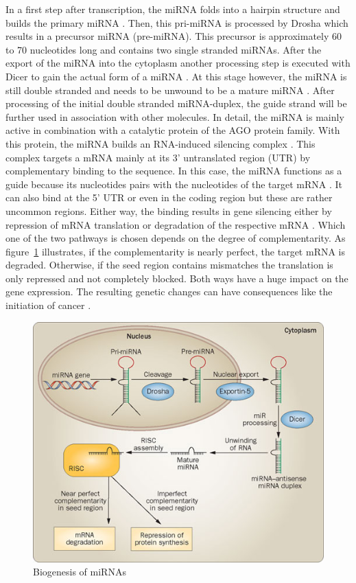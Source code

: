 \documentclass[11pt, a4paper, oneside]{book}
\begin{document}
In a first step after transcription, the miRNA folds into a hairpin structure and builds the primary miRNA \cite{Lee}. Then, this pri-miRNA is processed by Drosha which results in a precursor miRNA (pre-miRNA). This precursor is approximately 60 to 70 nucleotides long and contains two single stranded miRNAs. After the export of the miRNA into the cytoplasm another processing step is executed with Dicer to gain the actual form of a miRNA \cite{Lee}. At this stage however, the miRNA is still double stranded and needs to be unwound to be a mature miRNA \cite{Macfarlane}. After processing of the initial double stranded miRNA-duplex, the guide strand will be further used in association with other molecules. In detail, the miRNA is mainly active in combination with a catalytic protein of the AGO protein family. With this protein, the miRNA builds an RNA-induced silencing complex \cite{Ha}. This complex targets a mRNA mainly at its 3' untranslated region (UTR) by complementary binding to the sequence. In this case, the miRNA functions as a guide because its nucleotides pairs with the nucleotides of the target mRNA \cite{Macfarlane}. It can also bind at the 5' UTR or even in the coding region but these are rather uncommon regions. Either way, the binding results in gene silencing either by repression of mRNA translation or degradation of the respective mRNA \cite{Enright}. Which one of the two pathways is chosen depends on the degree of complementarity. As figure~\ref{biogenesis} illustrates, if the complementarity is nearly perfect, the target mRNA is degraded. Otherwise, if the seed region contains mismatches the translation is only repressed and not completely blocked. Both ways have a huge impact on the gene expression. The resulting genetic changes can have consequences like the initiation of cancer \cite{Macfarlane}.\\

\begin{figure}
\centering
\includegraphics[scale=0.45]{results/biogenesis.png}
\caption{Biogenesis of miRNAs}
\label{biogenesis}
\end{figure}  
\end{document}
